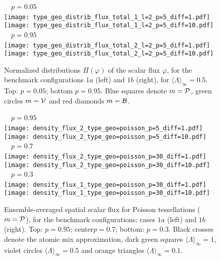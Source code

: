 \documentclass[final,authoryear,5p,times,twocolumn]{elsarticle}
\begin{document}
\begin{figure*}
\begin{center}
\,\,\,\, $p=0.05$ \,\,\,\,\\
\texttt{[image: type\_geo\_distrib\_flux\_total\_1\_l=2\_p=5\_diff=1.pdf]}\,\,\,\,
\texttt{[image: type\_geo\_distrib\_flux\_total\_1\_l=2\_p=5\_diff=10.pdf]}\\
\,\,\,\, $p=0.95$ \,\,\,\,\\
\texttt{[image: type\_geo\_distrib\_flux\_total\_2\_l=2\_p=5\_diff=1.pdf]}\,\,\,\,
\texttt{[image: type\_geo\_distrib\_flux\_total\_2\_l=2\_p=5\_diff=10.pdf]}\\
\end{center}
\caption{Normalized distributions $\Pi(\varphi)$ of the scalar flux $\varphi$, for the benchmark configurations $1a$ (left) and $1b$ (right), for ${\langle \Lambda \rangle}_{\infty}=0.5$. Top: $p=0.05$; bottom $p=0.95$. Blue squares denote $m={\cal P}$, green circles $m={\cal V}$ and red diamonds $m={\cal B}$.}
\label{histos2}
\end{figure*}

\clearpage

\begin{figure*}
\begin{center}
\,\,\,\, $p=0.95$ \,\,\,\,\\
\texttt{[image: density\_flux\_2\_type\_geo=poisson\_p=5\_diff=1.pdf]}\,\,\,\,
\texttt{[image: density\_flux\_2\_type\_geo=poisson\_p=5\_diff=10.pdf]}\\
\,\,\,\, $p=0.7$ \,\,\,\,\\
\texttt{[image: density\_flux\_2\_type\_geo=poisson\_p=30\_diff=1.pdf]}\,\,\,\,
\texttt{[image: density\_flux\_2\_type\_geo=poisson\_p=30\_diff=10.pdf]}\\
\,\,\,\, $p=0.3$ \,\,\,\,\\
\texttt{[image: density\_flux\_1\_type\_geo=poisson\_p=30\_diff=1.pdf]}\,\,\,\,
\texttt{[image: density\_flux\_1\_type\_geo=poisson\_p=30\_diff=10.pdf]}\\
\end{center}
\caption{Ensemble-averaged spatial scalar flux for Poisson tessellations ($m={\cal P}$), for the benchmark configurations: cases $1a$ (left) and $1b$ (right). Top: $p=0.95$; center$p=0.7$; bottom: $p=0.3$. Black crosses denote the atomic mix approximation, dark green squares ${\langle \Lambda \rangle}_{\infty}=1$, violet circles ${\langle \Lambda \rangle}_{\infty}=0.5$ and orange triangles ${\langle \Lambda \rangle}_{\infty}=0.1$.}
\label{density_2}
\end{figure*}
\end{document}

